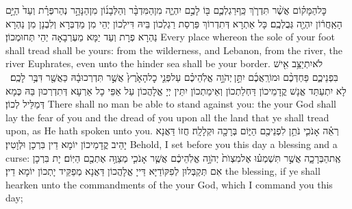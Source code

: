 {כׇּל\maqqaf הַמָּק֗וֹם אֲשֶׁ֨ר תִּדְרֹ֧ךְ כַּֽף\maqqaf רַגְלְכֶ֛ם בּ֖וֹ לָכֶ֣ם יִהְיֶ֑ה מִן\maqqaf הַמִּדְבָּ֨ר וְהַלְּבָנ֜וֹן מִן\maqqaf הַנָּהָ֣ר נְהַר\maqqaf פְּרָ֗ת וְעַד֙ הַיָּ֣ם הָאַֽחֲר֔וֹן יִהְיֶ֖ה גְּבֻלְכֶֽם׃}
{כָּל אַתְרָא דְּתִדְרוֹךְ פַּרְסַת רַגְלְכוֹן בֵּיהּ דִּילְכוֹן יְהֵי מִן מַדְבְּרָא וְלִבְנָן מִן נַהְרָא נַהְרָא פְרָת וְעַד יַמָּא מַעְרְבָאָה יְהֵי תְּחוּמְכוֹן׃}
{Every place whereon the sole of your foot shall tread shall be yours: from the wilderness, and Lebanon, from the river, the river Euphrates, even unto the hinder sea shall be your border.}{}
{לֹא\maqqaf יִתְיַצֵּ֥ב אִ֖ישׁ בִּפְנֵיכֶ֑ם פַּחְדְּכֶ֨ם וּמוֹרַֽאֲכֶ֜ם יִתֵּ֣ן \legarmeh  יְהֹוָ֣ה אֱלֹֽהֵיכֶ֗ם עַל\maqqaf פְּנֵ֤י כׇל\maqqaf הָאָ֙רֶץ֙ אֲשֶׁ֣ר תִּדְרְכוּ\maqqaf בָ֔הּ כַּאֲשֶׁ֖ר דִּבֶּ֥ר לָכֶֽם׃ \setuma }
{לָא יִתְעַתַּד אֱנָשׁ קֳדָמֵיכוֹן דַּחְלַתְכוֹן וְאֵימַתְכוֹן יִתֵּין יְיָ אֱלָהֲכוֹן עַל אַפֵּי כָל אַרְעָא דְּתִדְרְכוּן בַּהּ כְּמָא דְּמַלֵּיל לְכוֹן׃}
{There shall no man be able to stand against you: the \lord\space your God shall lay the fear of you and the dread of you upon all the land that ye shall tread upon, as He hath spoken unto you.}{}
{רְאֵ֗ה אָנֹכִ֛י נֹתֵ֥ן לִפְנֵיכֶ֖ם הַיּ֑וֹם בְּרָכָ֖ה וּקְלָלָֽה׃}
{חֲזוֹ דַּאֲנָא יָהֵיב קֳדָמֵיכוֹן יוֹמָא דֵין בִּרְכָן וּלְוָטִין׃}
{Behold, I set before you this day a blessing and a curse:}{}
{אֶֽת\maqqaf הַבְּרָכָ֑ה אֲשֶׁ֣ר תִּשְׁמְע֗וּ אֶל\maqqaf מִצְוֺת֙ יְהֹוָ֣ה אֱלֹֽהֵיכֶ֔ם אֲשֶׁ֧ר אָנֹכִ֛י מְצַוֶּ֥ה אֶתְכֶ֖ם הַיּֽוֹם׃}
{יָת בִּרְכָן אִם תְּקַבְּלוּן לְפִקּוֹדַיָּא דַּייָ אֱלָהֲכוֹן דַּאֲנָא מְפַקֵּיד יָתְכוֹן יוֹמָא דֵין׃}
{the blessing, if ye shall hearken unto the commandments of the \lord\space your God, which I command you this day;}{}
